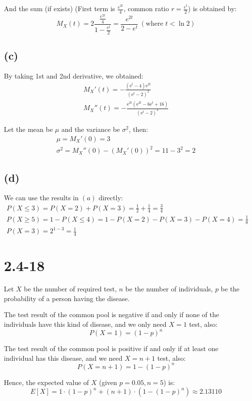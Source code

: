 \documentclass[12pt]{article}
\theoremstyle{definition}
\theoremstyle{remark}
\begin{document}
And the sum (if exists) (First term is $\frac{e^{2t}}{4}$, common ratio $r=\frac{e^{t}}{2}$) is obtained by:
\[M_X(t)=2\frac{\frac{e^{2t}}{4}}{1-\frac{e^{t}}{2}}=\frac{e^{2t}}{2-e^t}\ (\text{where } t<\ln{2})\]
\subsection*{(c)}
By taking 1st and 2nd derivative, we obtained:
\begin{align*}
    M_X'(t)=-\frac{\left(\mathrm{e}^{t} - 4\right) \mathrm{e}^{2t}}{\left(\mathrm{e}^{t} - 2\right)^{2}} \\
    M_X''(t)=-\frac{\mathrm{e}^{2t} \left(\mathrm{e}^{2t} - 6\mathrm{e}^{t} + 16\right)}{\left(\mathrm{e}^{t} - 2\right)^{3}}
\end{align*}
 
Let the mean be $\mu$ and the variance be $\sigma^2$, then:
\begin{align*}
    \mu=M_X'(0)=3 \\
    \sigma^2=M_X''(0)-(M_X'(0))^2=11-3^2=2
\end{align*}
\subsection*{(d)}
We can use the results in $(a)$ directly:
\begin{align*}
    P(X\le 3)=P(X=2)+P(X=3)=\frac{1}{2}+\frac{1}{4}=\frac{3}{4} \\
    P(X\ge 5)=1-P(X\le 4)=1-P(X=2)-P(X=3)-P(X=4)=\frac{1}{8} \\
    P(X=3)=2^{1-3}=\frac{1}{4}
\end{align*}

\newpage
\section*{2.4-18}
Let $X$ be the number of required test, $n$ be the number of individuals, $p$ be the probability of a person having the disease.

The test result of the common pool is negative if and only if none of the individuals have this kind of disease, and we only need $X=1$ test, also:
\[P(X=1)=(1-p)^n\] 

The test result of the common pool is positive if and only if at least one individual has this disease, and we need $X=n+1$ test, also:
\[P(X=n+1)=1-(1-p)^n\] 

Hence, the expected value of $X$ (given $p=0.05,n=5$) is:
\[E[X]=1\cdot (1-p)^n+(n+1)\cdot (1-(1-p)^n)\approx 2.13110\]
\end{document}
